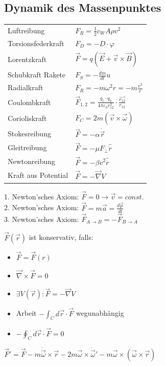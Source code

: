 \documentclass[12pt,a4paper]{article}
\renewcommand{\=}[1]{\stackrel{#1}{=}}
\theoremstyle{definition}
\theoremstyle{remark}
\begin{document}
\subsection{Dynamik des Massenpunktes}
\begin{center}
\begin{minipage}[t]{.5\linewidth}
\vspace{0pt}
\begin{tabular}{ll}
Luftreibung & $F_R = \frac{1}{2} c_W A \rho v^2$\\
Torsionsfederkraft & $F_D = -D \cdot \varphi$\\
Lorentzkraft & $\vec{F} = q(\vec{E} + \vec{v} \times \vec{B})$\\
Schubkraft Rakete & $F_S = - \frac{dm}{dt}u$\\
Radialkraft & $F_R = -m \omega^2 r = -m \frac{v^2}{r}$\\
Coulombkraft & $\vec{F}_{1,2} = \frac{q_1 \cdot q_2}{4 \pi \varepsilon_0 r_{12}^2} \cdot \frac{\vec{r_{12}}}{r_{12}}$\\
Corioliskraft & $F_C = 2m(\vec{v} \times \vec{\omega})$\\
Stokesreibung & $\vec{F} = - \alpha \dot{\vec{r}}$\\
Gleitreibung & $\vec{F} = -\mu F_{\perp} \hat{\dot{r}}$\\
Newtonreibung & $\vec{F} = -\beta v^2 \hat{\dot{r}}$\\
Kraft aus Potential & $\vec{F} = -\vec{\nabla}V$\\
\end{tabular}
\end{minipage}%
\begin{minipage}[t]{.5\linewidth}
\vspace{0pt}
\begin{framed}
1. Newton'sches Axiom: $\vec F = 0 \rightarrow \vec v = const.$\\
2. Newton'sches Axiom: $\vec{F} = m\vec{a} = \frac{d\vec{p}}{dt}$\\
3. Newton'sches Axiom: $\vec F_{A \rightarrow B} = - \vec F_{B \rightarrow A}$
\end{framed}

$\vec{F}(\vec{r})$ ist konservativ, falls:
\begin{itemize}
\itemsep-0.5em
\item $\vec{F} = \vec{F}(r)$
\item $\vec\nabla \times \vec{F} = 0$
\item $\exists V(\vec{r}): \vec{F} = -\vec\nabla V$
\item Arbeit $-\int_C d\vec{r} \cdot \vec{F}$ wegunabhängig
\item $-\oint_C d\vec{r} \cdot \vec{F} = 0$
\end{itemize}
$\vec{F}' = \vec{F} - m\dot{\vec{\omega}} \times \vec{r} - 2m\vec{\omega} \times \dot{\vec{\omega}}' - m\vec{\omega} \times (\vec{\omega} \times \vec{r})$
\end{minipage}
\end{center}
\end{document}
